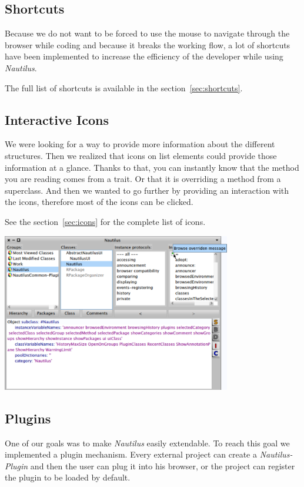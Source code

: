\documentclass[a4paper,10pt,twoside]{book}
\newcommand\nautilus{\emph{Nautilus}\xspace}
\begin{document}
\subsection*{Shortcuts}

Because we do not want to be forced to use the mouse to navigate through the browser while coding and because it breaks the working flow, a lot of shortcuts have been implemented to increase the efficiency of the developer while using \nautilus.

The full list of shortcuts is available in the section~\ref{sec:shortcuts}. 

\subsection*{Interactive Icons}

We were looking for a way to provide more information about the different structures. Then we realized that icons on list elements could provide those information at a glance. Thanks to that, you can instantly know that the method you are reading comes from a trait. Or that it is overriding a method from a superclass. And then we wanted to go further by providing an interaction with the icons, therefore most of the icons can be clicked. 

See the section~\ref{sec:icons} for the complete list of icons.
\begin{center}
	\includegraphics[width=10cm]{figures/icons1}
	\label{fig:icons1}
\end{center}


\subsection*{Plugins}

One of our goals was to make \nautilus easily extendable. To reach this goal we implemented a plugin mechanism. Every external project can create a \emph{Nautilus-Plugin} and then the user can plug it into his browser, or the project can register the plugin to be loaded by default. 
\end{document}
